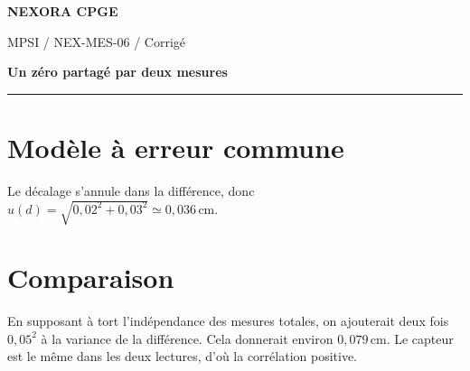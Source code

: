\documentclass[11pt,a4paper]{article}
\begin{document}
{\small\bfseries\color{nexorablue} NEXORA CPGE}\par
{\small MPSI / NEX-MES-06 / Corrigé}\par
{\LARGE\bfseries Un zéro partagé par deux mesures}\par
\vspace{0.25em}\hrule\vspace{0.6em}

\section*{Modèle à erreur commune}
Le décalage s’annule dans la différence, donc $u(d)=\sqrt{0{,}02^2+0{,}03^2}\simeq0{,}036\,\mathrm{cm}$.

\section*{Comparaison}
En supposant à tort l’indépendance des mesures totales, on ajouterait deux fois $0{,}05^2$ à la variance de la différence. Cela donnerait environ $0{,}079\,\mathrm{cm}$. Le capteur est le même dans les deux lectures, d’où la corrélation positive.
\end{document}
